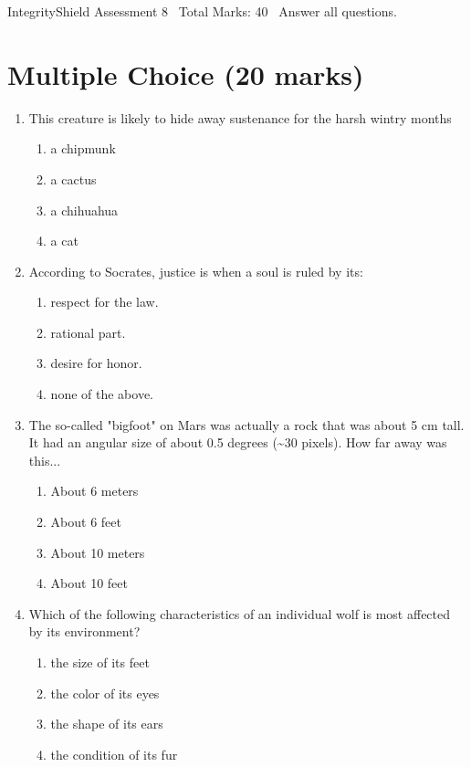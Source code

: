 \documentclass[12pt]{article}
\begin{document}
\begin{center}
IntegrityShield Assessment 8 \
Total Marks: 40 \
Answer all questions.
\end{center}

\section*{Multiple Choice (20 marks)}
\begin{enumerate}[label=\arabic*.]
\item This creature is likely to hide away sustenance for the harsh wintry months
\begin{enumerate}[label=(\alph*)]
    \item a chipmunk
    \item a cactus
    \item a chihuahua
    \item a cat
\end{enumerate}
\item According to Socrates, justice is when a soul is ruled by its:
\begin{enumerate}[label=(\alph*)]
    \item respect for the law.
    \item rational part.
    \item desire for honor.
    \item none of the above.
\end{enumerate}
\item The so-called "bigfoot" on Mars was actually a rock that was about 5 cm tall. It had an angular size of about 0.5 degrees (\textasciitilde{}30 pixels). How far away was this...
\begin{enumerate}[label=(\alph*)]
    \item About 6 meters
    \item About 6 feet
    \item About 10 meters
    \item About 10 feet
\end{enumerate}
\item Which of the following characteristics of an individual wolf is most affected by its environment?
\begin{enumerate}[label=(\alph*)]
    \item the size of its feet
    \item the color of its eyes
    \item the shape of its ears
    \item the condition of its fur

\end{enumerate}
\end{enumerate}
\end{document}
